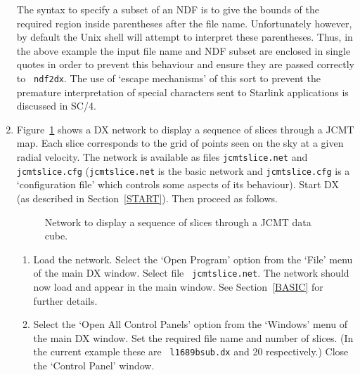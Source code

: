 \documentclass[twoside,11pt]{article}
\newcommand{\xref}[3]{#1}
\begin{document}
\begin{enumerate}
   The syntax to specify a subset of an NDF is to give the bounds of
   the required region inside parentheses after the file name.
   Unfortunately however, by default the Unix shell will attempt to
   interpret these parentheses.  Thus, in the above example the input
   file name and NDF subset are enclosed in single quotes in order to
   prevent this behaviour and ensure they are passed correctly to {\tt
   ndf2dx}.  The use of `escape mechanisms'  of this sort to prevent the
   premature interpretation of special characters sent to Starlink
   applications is discussed in \xref{SC/4}{sc4}{sc4_se_spec_char}\cite{SC4}.

  \item Figure~\ref{JCMTSLICE} shows a DX network to display a sequence
   of slices through a JCMT map.  Each slice corresponds to the grid
   of points seen on the sky at a given radial velocity.  The network
   is available as files {\tt jcmtslice.net} and {\tt jcmtslice.cfg}
   ({\tt jcmtslice.net} is the basic network and {\tt jcmtslice.cfg} is
   a `configuration file' which controls some aspects of its behaviour).
   Start DX (as described in Section~\ref{START}).  Then proceed as
   follows.

  \begin{figure}[htbp]

  \begin{center}
  \leavevmode
  \epsfxsize=450pt
  \end{center}

  \caption[Network to display a sequence of slices through a JCMT
   data cube.]{Network to display a sequence of slices through a JCMT
   data cube. \label{JCMTSLICE} }

  \end{figure}

  \begin{enumerate}

    \item Load the network.  Select the `Open Program' option from the
     `File' menu of the main DX window.  Select file {\tt
     jcmtslice.net}.  The network should now load and appear in the
     main window.  See Section~\ref{BASIC} for further details.

    \item Select the `Open All Control Panels' option from the `Windows'
     menu of the main DX window.  Set the required file name and
     number of slices.  (In the current example these are {\tt
     l1689bsub.dx} and 20 respectively.)  Close the `Control Panel'
     window.


\end{enumerate}
\end{enumerate}
\end{document}
